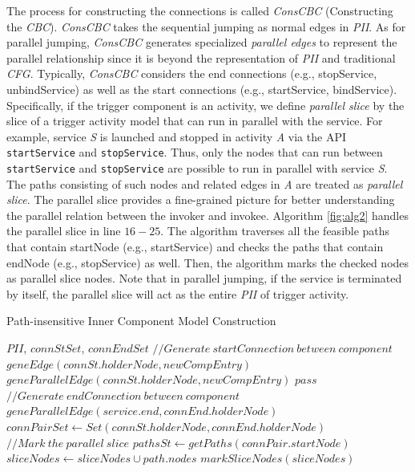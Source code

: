 The process for constructing the connections is called \textit{ConsCBC} (Constructing the \textit{CBC}). \textit{ConsCBC} takes the sequential jumping as normal edges in \textit{PII}. As for parallel jumping, \textit{ConsCBC} generates specialized \textit{parallel edges} to represent the parallel relationship since it is beyond the representation of \textit{PII} and traditional \textit{CFG}. Typically, \textit{ConsCBC} considers the end connections (e.g., stopService, unbindService) as well as the start connections (e.g., startService, bindService). Specifically, if the trigger component is an activity, we define \textit{parallel slice} by the slice of a trigger activity model that can run in parallel with the service. For example, service \textit{S} is launched and stopped in activity \textit{A} via the API \texttt{startService} and \texttt{stopService}. Thus, only the nodes that can run between \texttt{startService} and \texttt{stopService} are possible to run in parallel with service \textit{S}. The paths consisting of such nodes and related edges in \textit{A} are treated as \textit{parallel slice}. The parallel slice provides a fine-grained picture for better understanding the parallel relation between the invoker and invokee. Algorithm \ref{fig:alg2} handles the parallel slice in line $16-25$. The algorithm traverses all the feasible paths that contain startNode (e.g., startService) and checks the paths that contain endNode (e.g., stopService) as well. Then, the algorithm marks the checked nodes as parallel slice nodes. Note that in parallel jumping, if the service is terminated by itself, the parallel slice will act as the entire \textit{PII} of trigger activity.

\begin{algorithm}[!t]
\caption{Path-insensitive Inner Component Model Construction}
\footnotesize
\begin{algorithmic}[1]
 {$PII$, $connStSet$, $connEndSet$}
\State $//Generate\ startConnection\ between\ component$
\State $        geneEdge(connSt.holderNode, newCompEntry)$
\State $        geneParallelEdge(connSt.holderNode, newCompEntry)$
\Else $pass$
\EndIf
\EndFor
\State $ //Generate\ endConnection\ between\ component $
\State $  geneParallelEdge(service.end, connEnd.holderNode )$
\EndFor    
\State $ connPairSet\leftarrow Set(connSt.holderNode,connEnd.holderNode)$
\State $       //Mark\ the\ parallel\ slice$
\State $  pathsSt \leftarrow getPaths(connPair.startNode)$
\State $   sliceNodes \leftarrow sliceNodes \cup path.nodes$
\EndIf
\EndFor
\EndFor
\State $       markSliceNodes(sliceNodes )$
\EndProcedure
\end{algorithmic}
\label{fig:alg2}
\end{algorithm}


